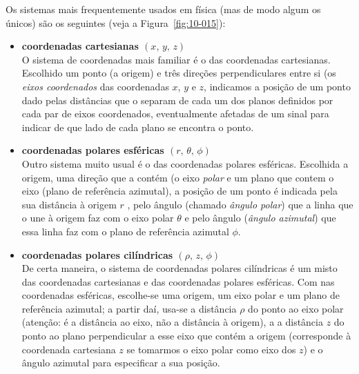 Os sistemas mais frequentemente usados em física (mas de modo algum os únicos)
são os seguintes (veja a Figura~\ref{fig:10-015}):
\begin{itemize}
\item\textbf{coordenadas cartesianas $(x,\,y,\,z)$}\\
    O sistema de coordenadas mais familiar é o das coordenadas cartesianas.
    Escolhido um ponto (a origem) e três direções perpendiculares entre si (os
    \emph{eixos coordenados} das coordenadas $x$, $y$ e $z$, indicamos a posição
    de um ponto dado pelas distâncias que o separam de cada um dos planos
    definidos por cada par de eixos coordenados, eventualmente afetadas de um
    sinal para indicar de que lado de cada plano se encontra o ponto.
\item\textbf{coordenadas polares esféricas $(r,\,\theta,\,\phi)$}\\
    Outro sistema muito usual é o das coordenadas polares esféricas. Escolhida a
    origem, uma direção que a contém (o eixo \emph{polar} e um plano que contem
    o eixo (plano de referência azimutal), a posição
    de um ponto é indicada pela sua distância à origem $r$ , pelo ângulo (chamado
    \emph{ângulo polar}) que a linha que o une à origem faz com o eixo polar
    $\theta$ e pelo ângulo (\emph{ângulo azimutal}) que essa linha faz com o
    plano de referência azimutal $\phi$.
\item\textbf{coordenadas polares cilíndricas $(\rho,\,z,\,\phi)$}\\
    De certa maneira, o sistema de coordenadas polares cilíndricas é um misto
    das coordenadas cartesianas e das coordenadas polares esféricas. Com nas
    coordenadas esféricas, escolhe-se uma origem, um eixo polar e um plano de
    referência azimutal; a partir daí, usa-se a distância $\rho$ do ponto ao
    eixo polar (atenção: é a distância ao eixo, não a distância à origem), a
    a distância $z$ do ponto ao plano perpendicular a esse eixo que contém a
    origem (corresponde à coordenada cartesiana $z$ se tomarmos o eixo polar
    como eixo dos $z$) e o ângulo azimutal para especificar a sua posição.
\end{itemize}
